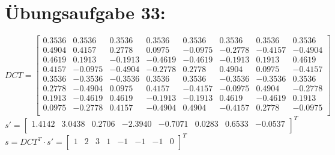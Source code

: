 

	\section*{Übungsaufgabe 33:}

	$
	DCT =
	\begin{bmatrix}
	0.3536 &    0.3536 &   0.3536 &   0.3536 &   0.3536 &   0.3536 &   0.3536 &   0.3536 \\
	0.4904 &    0.4157 &   0.2778 &   0.0975 &  -0.0975 &  -0.2778 &  -0.4157 &  -0.4904 \\
	0.4619 &    0.1913 &  -0.1913 &  -0.4619 &  -0.4619 &  -0.1913 &   0.1913 &   0.4619 \\
	0.4157 &   -0.0975 &  -0.4904 &  -0.2778 &   0.2778 &   0.4904 &   0.0975 &  -0.4157 \\
	0.3536 &   -0.3536 &  -0.3536 &   0.3536 &   0.3536 &  -0.3536 &  -0.3536 &   0.3536 \\ 
	0.2778 &   -0.4904 &   0.0975 &   0.4157 &  -0.4157 &  -0.0975 &   0.4904 &  -0.2778 \\
	0.1913 &   -0.4619 &   0.4619 &  -0.1913 &  -0.1913 &   0.4619 &  -0.4619 &   0.1913 \\
	0.0975 &   -0.2778 &   0.4157 &  -0.4904 &   0.4904 &  -0.4157 &   0.2778 &  -0.0975 \\
	\end{bmatrix}
	$ \\ $
	s' =
	\begin{bmatrix}
	1.4142 &    3.0438 &   0.2706 &  -2.3940 &  -0.7071 &   0.0283 &   0.6533 &  -0.0537 \\
	\end{bmatrix}
	^T $ \\ $
	s = DCT^T \cdot s' =
	\begin{bmatrix}
	1 &    2 &    3 &    1 &   -1 &   -1 &   -1 &    0 \\
	\end{bmatrix}
	^T $
	
